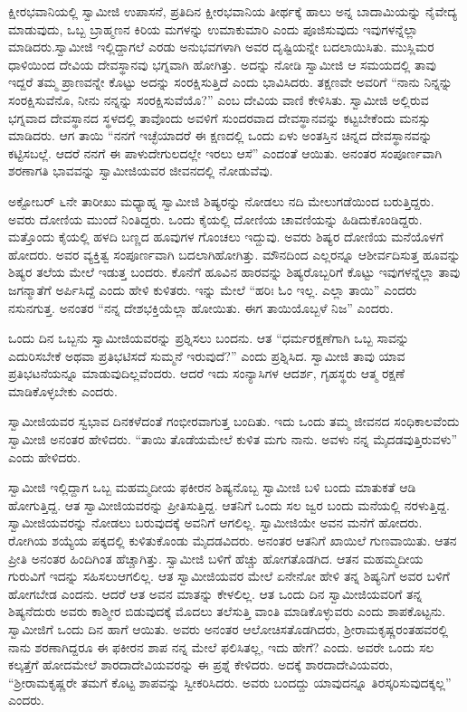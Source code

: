  ಕ್ಷೀರಭವಾನಿಯಲ್ಲಿ ಸ್ವಾಮೀಜಿ ಉಪಾಸನೆ, ಪ್ರತಿದಿನ ಕ್ಷೀರಭವಾನಿಯ ತೀರ್ಥಕ್ಕೆ ಹಾಲು ಅನ್ನ ಬಾದಾಮಿಯನ್ನು ನೈವೇದ್ಯ ಮಾಡುವುದು, ಒಬ್ಬ ಬ್ರಾಹ್ಮಣನ ಕಿರಿಯ ಮಗಳನ್ನು ಉಮಾಕುಮಾರಿ ಎಂದು ಪೂಜಿಸುವುದು ಇವುಗಳನ್ನೆಲ್ಲಾ ಮಾಡಿದರು.\break ಸ್ವಾಮೀಜಿ ಇಲ್ಲಿದ್ದಾಗಲೆ ಎರಡು ಅನುಭವಗಳಾಗಿ ಅವರ ದೃಷ್ಟಿಯನ್ನೇ ಬದಲಾಯಿಸಿತು. ಮುಸ್ಲಿಮರ ಧಾಳಿಯಿಂದ ದೇವಿಯ ದೇವಸ್ಥಾನವು ಭಗ್ನವಾಗಿ ಹೋಗಿತ್ತು. ಅದನ್ನು ನೋಡಿ ಸ್ವಾಮೀಜಿ ಆ ಸಮಯದಲ್ಲಿ ತಾವು ಇದ್ದರೆ ತಮ್ಮ ಪ್ರಾಣವನ್ನೇ ಕೊಟ್ಟು ಅದನ್ನು ಸಂರಕ್ಷಿಸುತ್ತಿದೆ ಎಂದು ಭಾವಿಸಿದರು. ತಕ್ಷಣವೇ ಅವರಿಗೆ “ನಾನು ನಿನ್ನನ್ನು ಸಂರಕ್ಷಿಸುವೆನೊ, ನೀನು ನನ್ನನ್ನು ಸಂರಕ್ಷಿಸುವೆಯೊ?” ಎಂಬ ದೇವಿಯ ವಾಣಿ ಕೇಳಿಸಿತು. ಸ್ವಾಮೀಜಿ ಅಲ್ಲಿರುವ ಭಗ್ನವಾದ ದೇವಸ್ಥಾನದ ಸ್ಥಳದಲ್ಲಿ ತಾವೊಂದು ಅವಳಿಗೆ ಸುಂದರವಾದ ದೇವಸ್ಥಾನವನ್ನು ಕಟ್ಟಬೇಕೆಂದು ಮನಸ್ಸು ಮಾಡಿದರು. ಆಗ ತಾಯಿ “ನನಗೆ ಇಚ್ಛೆಯಾದರೆ ಈ ಕ್ಷಣದಲ್ಲಿ ಒಂದು ಏಳು ಅಂತಸ್ತಿನ ಚಿನ್ನದ ದೇವಸ್ಥಾನವನ್ನು ಕಟ್ಟಿಸಬಲ್ಲೆ. ಆದರೆ ನನಗೆ ಈ ಪಾಳುದೇಗುಲದಲ್ಲೇ ಇರಲು ಆಸೆ” ಎಂದಂತೆ ಆಯಿತು. ಅನಂತರ ಸಂಪೂರ್ಣವಾಗಿ ಶರಣಾಗತಿ ಭಾವವನ್ನು ಸ್ವಾಮೀಜಿಯವರ ಜೀವನದಲ್ಲಿ ನೋಡುವೆವು. 

 ಅಕ್ಟೋಬರ್ ೬ನೇ ತಾರೀಖು ಮಧ್ಯಾಹ್ನ ಸ್ವಾಮೀಜಿ ಶಿಷ್ಯರನ್ನು ನೋಡಲು ನದಿ ಮೇಲುಗಡೆಯಿಂದ ಬರುತ್ತಿದ್ದರು. ಅವರು ದೋಣಿಯ ಮುಂದೆ ನಿಂತಿದ್ದರು. ಒಂದು ಕೈಯಲ್ಲಿ ದೋಣಿಯ ಚಾವಣಿಯನ್ನು ಹಿಡಿದುಕೊಂಡಿದ್ದರು. ಮತ್ತೊಂದು ಕೈಯಲ್ಲಿ ಹಳದಿ ಬಣ್ಣದ ಹೂವುಗಳ ಗೊಂಚಲು ಇದ್ದುವು. ಅವರು ಶಿಷ್ಯರ ದೋಣಿಯ ಮನೆಯೊಳಗೆ ಹೋದರು. ಅವರ ವ್ಯಕ್ತಿತ್ವ ಸಂಪೂರ್ಣವಾಗಿ ಬದಲಾಗಿಹೋಗಿತ್ತು. ಮೌನದಿಂದ ಎಲ್ಲರನ್ನೂ ಆಶೀರ್ವದಿಸುತ್ತ ಹೂವನ್ನು ಶಿಷ್ಯರ ತಲೆಯ ಮೇಲೆ ಇಡುತ್ತ ಬಂದರು. ಕೊನೆಗೆ ಹೂವಿನ ಹಾರವನ್ನು ಶಿಷ್ಯರೊಬ್ಬರಿಗೆ ಕೊಟ್ಟು ಇವುಗಳನ್ನೆಲ್ಲಾ ತಾವು ಜಗನ್ಮಾತೆಗೆ ಅರ್ಪಿಸಿದ್ದೆ ಎಂದು ಹೇಳಿ ಕುಳಿತರು. ಇನ್ನು ಮೇಲೆ “ಹರಿಃ ಓಂ ಇಲ್ಲ. ಎಲ್ಲಾ ತಾಯಿ” ಎಂದರು ನಸುನಗುತ್ತ. ಅನಂತರ “ನನ್ನ ದೇಶಭಕ್ತಿಯೆಲ್ಲಾ ಹೋಯಿತು. ಈಗ ತಾಯಿಯೊಬ್ಬಳೆ ನಿಜ” ಎಂದರು. 

 ಒಂದು ದಿನ ಒಬ್ಬನು ಸ್ವಾಮೀಜಿಯವರನ್ನು ಪ್ರಶ್ನಿಸಲು ಬಂದನು. ಆತ “ಧರ್ಮರಕ್ಷಣೆಗಾಗಿ ಒಬ್ಬ ಸಾವನ್ನು ಎದುರಿಸಬೇಕೆ ಅಥವಾ ಪ್ರತಿಭಟಿಸದೆ ಸುಮ್ಮನೆ ಇರುವುದೆ?” ಎಂದು ಪ್ರಶ್ನಿಸಿದ. ಸ್ವಾಮೀಜಿ ತಾವು ಯಾವ ಪ್ರತಿಭಟನೆಯನ್ನೂ ಮಾಡುವುದಿಲ್ಲವೆಂದರು. ಆದರೆ ಇದು ಸಂನ್ಯಾಸಿಗಳ ಆದರ್ಶ, ಗೃಹಸ್ಥರು ಆತ್ಮ ರಕ್ಷಣೆ ಮಾಡಿಕೊಳ್ಳಬೇಕು ಎಂದರು. 

 ಸ್ವಾಮೀಜಿಯವರ ಸ್ವಭಾವ ದಿನಕಳೆದಂತೆ ಗಂಭೀರವಾಗುತ್ತ ಬಂದಿತು. ಇದು ಒಂದು ತಮ್ಮ ಜೀವನದ ಸಂಧಿಕಾಲವೆಂದು ಸ್ವಾಮೀಜಿ ಅನಂತರ ಹೇಳಿದರು. “ತಾಯಿ ತೊಡೆಯಮೇಲೆ ಕುಳಿತ ಮಗು ನಾನು. ಅವಳು ನನ್ನ ಮೈದಡವುತ್ತಿರುವಳು” ಎಂದು ಹೇಳಿದರು. 

 ಸ್ವಾಮೀಜಿ ಇಲ್ಲಿದ್ದಾಗ ಒಬ್ಬ ಮಹಮ್ಮದೀಯ ಫಕೀರನ ಶಿಷ್ಯನೊಬ್ಬ ಸ್ವಾಮೀಜಿ ಬಳಿ ಬಂದು ಮಾತುಕತೆ ಆಡಿ ಹೋಗುತ್ತಿದ್ದ. ಆತ ಸ್ವಾಮೀಜಿಯವರನ್ನು ಪ್ರೀತಿಸುತ್ತಿದ್ದ. ಆತನಿಗೆ ಒಂದು ಸಲ ಜ್ವರ ಬಂದು ಮನೆಯಲ್ಲಿ ನರಳುತ್ತಿದ್ದ. ಸ್ವಾಮೀಜಿಯವರನ್ನು ನೋಡಲು ಬರುವುದಕ್ಕೆ ಅವನಿಗೆ ಆಗಲಿಲ್ಲ. ಸ್ವಾಮೀಜಿಯೇ ಅವನ ಮನೆಗೆ ಹೋದರು. ರೋಗಿಯ ಶಯ್ಯೆಯ ಪಕ್ಕದಲ್ಲಿ ಕುಳಿತುಕೊಂಡು ಮೈದಡವಿದರು. ಅನಂತರ ಆತನಿಗೆ ಖಾಯಿಲೆ ಗುಣವಾಯಿತು. ಆತನ ಪ್ರೀತಿ ಅನಂತರ ಹಿಂದಿಗಿಂತ ಹೆಚ್ಚಾಗಿತ್ತು. ಸ್ವಾಮೀಜಿ ಬಳಿಗೆ ಹೆಚ್ಚು ಹೋಗತೊಡಗಿದ. ಆತನ ಮಹಮ್ಮದೀಯ ಗುರುವಿಗೆ ಇದನ್ನು ಸಹಿಸಲು\break ಆಗಲಿಲ್ಲ. ಆತ ಸ್ವಾಮೀಜಿಯವರ ಮೇಲೆ ಏನೇನೋ ಹೇಳಿ ತನ್ನ ಶಿಷ್ಯನಿಗೆ ಅವರ ಬಳಿಗೆ ಹೋಗಬೇಡ ಎಂದನು. ಆದರೆ ಆತ ಅವನ ಮಾತನ್ನು ಕೇಳಲಿಲ್ಲ. ಆತ ಒಂದು ದಿನ ಸ್ವಾಮೀಜಿಯವರಿಗೆ ತನ್ನ ಶಿಷ್ಯನೆದುರು ಅವರು ಕಾಶ್ಮೀರ ಬಿಡುವುದಕ್ಕೆ ಮೊದಲು ತಲೆಸುತ್ತಿ ವಾಂತಿ ಮಾಡಿಕೊಳ್ಳುವರು ಎಂದು ಶಾಪಕೊಟ್ಟನು. ಸ್ವಾಮೀಜಿಗೆ ಒಂದು ದಿನ ಹಾಗೆ ಆಯಿತು. ಅವರು ಅನಂತರ ಆಲೋಚಿಸತೊಡಗಿದರು, ಶ‍್ರೀರಾಮಕೃಷ್ಣರಂತಹವರಲ್ಲಿ ನಾನು ಶರಣಾಗಿದ್ದರೂ ಈ ಫಕೀರನ ಶಾಪ ನನ್ನ ಮೇಲೆ ಫಲಿಸಿತಲ್ಲ, ಇದು ಹೇಗೆ? ಎಂದು. ಅವರೇ ಒಂದು ಸಲ ಕಲ್ಕತ್ತೆಗೆ ಹೋದಮೇಲೆ ಶಾರದಾದೇವಿಯವರನ್ನು ಈ ಪ್ರಶ್ನೆ ಕೇಳಿದರು. ಅದಕ್ಕೆ ಶಾರದಾದೇವಿಯವರು, “ಶ‍್ರೀರಾಮಕೃಷ್ಣರೇ ತಮಗೆ ಕೊಟ್ಟ ಶಾಪವನ್ನು ಸ್ವೀಕರಿಸಿದರು. ಅವರು ಬಂದದ್ದು ಯಾವುದನ್ನೂ ತಿರಸ್ಕರಿಸುವುದಕ್ಕಲ್ಲ” ಎಂದರು. 

